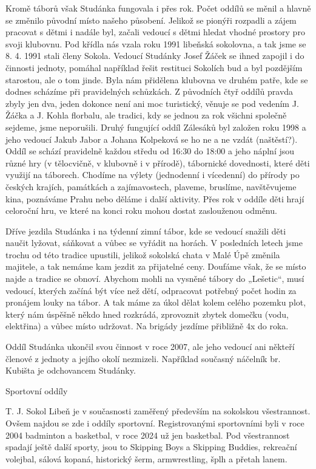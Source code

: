 Kromě táborů však Studánka fungovala i přes rok. Počet oddílů se měnil a
hlavně se změnilo původní místo našeho působení. Jelikož se pionýři
rozpadli a zájem pracovat s dětmi i nadále byl, začali vedoucí s dětmi
hledat vhodné prostory pro svoji klubovnu. Pod křídla nás vzala roku
1991 libeňská sokolovna, a tak jsme se 8. 4. 1991 stali členy Sokola.
Vedoucí Studánky Josef Žáček se ihned zapojil i do činnosti jednoty,
pomáhal například řešit restituci Sokolích bud a byl pozdějším
starostou, ale o tom jinde. Byla nám přidělena klubovna ve druhém patře,
kde se dodnes scházíme při pravidelných schůzkách. Z původních čtyř
oddílů pravda zbyly jen dva, jeden dokonce není ani moc turistický,
věnuje se pod vedením J. Žáčka a J. Kohla florbalu, ale tradici, kdy se
jednou za rok všichni společně sejdeme, jsme neporušili. Druhý fungující
oddíl Zálesáků byl založen roku 1998 a jeho vedoucí Jakub Jabor a Johana
Kolpeková se ho ne a ne vzdát (naštěstí?). Oddíl se schází pravidelně
každou středu od 16:30 do 18:00 a jeho náplní jsou různé hry (v
tělocvičně, v klubovně i v přírodě), tábornické dovednosti, které děti
využijí na táborech. Chodíme na výlety (jednodenní i vícedenní) do
přírody po českých krajích, památkách a zajímavostech, plaveme,
bruslíme, navštěvujeme kina, poznáváme Prahu nebo děláme i další
aktivity. Přes rok v oddíle děti hrají celoroční hru, ve které na konci
roku mohou dostat zaslouženou odměnu.

Dříve jezdila Studánka i na týdenní zimní tábor, kde se vedoucí snažili
děti naučit lyžovat, sáňkovat a vůbec se vyřádit na horách. V posledních
letech jsme trochu od této tradice upustili, jelikož sokolská chata v
Malé Úpě změnila majitele, a tak nemáme kam jezdit za přijatelné ceny.
Doufáme však, že se místo najde a tradice se obnoví. Abychom mohli na
vysněné tábory do „Lešetic``, musí vedoucí, kterých začíná být více než
dětí, odpracovat potřebný počet hodin za pronájem louky na tábor. A tak
máme za úkol dělat kolem celého pozemku plot, který nám úspěšně někdo
hned rozkrádá, zprovoznit zbytek domečku (vodu, elektřina) a vůbec místo
udržovat. Na brigády jezdíme přibližně 4x do roka.

Oddíl Studánka ukončil svou činnost v roce 2007, ale jeho vedoucí ani
někteří členové z jednoty a jejího okolí nezmizeli. Například současný
náčelník br. Kubišta je odchovancem Studánky.

Sportovní oddíly

T. J. Sokol Libeň je v současnosti zaměřený především na sokolskou
všestrannost. Ovšem najdou se zde i oddíly sportovní. Registrovanými
sportovními byli v roce 2004 badminton a basketbal, v roce 2024 už jen
basketbal. Pod všestrannost spadají ještě další sporty, jsou to Skipping
Boys a Skipping Buddies, rekreační volejbal, sálová kopaná, historický
šerm, armwrestling, šplh a přetah lanem.

